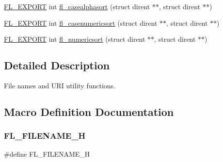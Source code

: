 \begin{DoxyCompactItemize}
\item 
\hyperlink{_fl___export_8_h_aa9ba29a18aee9d738370a06eeb4470fc}{F\+L\+\_\+\+E\+X\+P\+O\+RT} int \hyperlink{group__filenames_ga533169b53070b3286c3aaadf785207ea}{fl\+\_\+casealphasort} (struct dirent $\ast$$\ast$, struct dirent $\ast$$\ast$)
\item 
\hyperlink{_fl___export_8_h_aa9ba29a18aee9d738370a06eeb4470fc}{F\+L\+\_\+\+E\+X\+P\+O\+RT} int \hyperlink{group__filenames_ga0219de041655866e7198f93090d8dd1d}{fl\+\_\+casenumericsort} (struct dirent $\ast$$\ast$, struct dirent $\ast$$\ast$)
\item 
\hyperlink{_fl___export_8_h_aa9ba29a18aee9d738370a06eeb4470fc}{F\+L\+\_\+\+E\+X\+P\+O\+RT} int \hyperlink{group__filenames_ga2800a56e49038e2707b16e7fc340242a}{fl\+\_\+numericsort} (struct dirent $\ast$$\ast$, struct dirent $\ast$$\ast$)
\end{DoxyCompactItemize}


\subsection{Detailed Description}
File names and U\+RI utility functions. 

\subsection{Macro Definition Documentation}
\mbox{\label{filename_8_h_a397ec8b8e50e52d9b1aea1de504d636b}} 
\subsubsection{\texorpdfstring{F\+L\+\_\+\+F\+I\+L\+E\+N\+A\+M\+E\+\_\+H}{FL\_FILENAME\_H}}
{\footnotesize\ttfamily \#define F\+L\+\_\+\+F\+I\+L\+E\+N\+A\+M\+E\+\_\+H}

